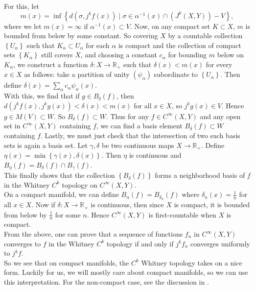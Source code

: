 \documentclass[reqno]{amsart}
\theoremstyle{definition}
\theoremstyle{remark}
\begin{document}
For this, let
\[
m(x) = \inf \left\{ d\left( \sigma, j^{k}f(x) \right) 
 \mid \sigma \in \alpha^{-1}(x) \cap
\left( J^{k}(X,Y) \right) -V \right\},
\] 
where we let
$m(x) = \infty$ if $\alpha^{-1}(x) \subset V$.
Now, on any compact set $K \subset X$, 
$m$ is bounded from below by some constant. So
covering $X$ by a countable collection 
$\left\{ U_{\alpha} \right\} $ such that
$K_{\alpha} \subset U_{\alpha}$ for each $\alpha$ is compact
and the collection of compact
sets $\left\{ K_{\alpha} \right\} $  still covers
$X$, and
choosing a constant
$c_{\alpha}$ for bounding $m$ below on $K_{\alpha}$, we
construct a function
$\delta \colon X \to \mathbb{R}_+$ such that
$\delta(x) < m(x)$ for every $x \in X$ as follows:
take a partition of unity $\left( \psi_{\alpha} \right) $
subordinate to
$\left\{ U_{\alpha} \right\} $. Then define
$\delta (x) = 
\sum_{\alpha} c_{\alpha} \psi_{\alpha}(x)$.\\
With this, we find that
if $g \in B_{\delta}(f)$, then
$d \left( j^{k}f(x), j^{k}g(x) \right) <
\delta(x) < m(x)$ for all
$x \in X$, so
$j^{k}g(x) \in V$. Hence
$g \in M(V) \subset W$.
So $B_{\delta}(f) \subset W$. 
Thus for any
$f \in C^{\infty}(X,Y)$ 
and any open set in $C^{\infty}(X,Y)$ containing $f$,
we can find a basis element
$B_{\delta}(f) \subset W$ containing $ f$.
Lastly, we must just check that
the intersection of two such basis sets is again a basis set.
Let
$\gamma, \delta$ be two continuous maps
$X \to \mathbb{R}_+$. Define
$\eta (x) = \min \left\{ \gamma(x), \delta(x) \right\} $.
Then $\eta$ is continuous and
$B_{\eta}(f) = 
B_{\delta}(f) \cap B_{\gamma}(f)$.\\
This finally shows that the collection
$\left\{ B_{\delta}(f) \right\} $ forms a neighborhood
basis of $f$ in the Whitney $C^{k}$ topology
on $C^{\infty}(X,Y)$.\\
\linebreak
On a compact manifold, we can define
$B_n(f) = B_{\delta_n}(f)$ where
$\delta_n (x) = \frac{1}{n}$ for all $x \in X$.
Now if $\delta \colon X \to \mathbb{R}_+$ is continuous, then
since $X$ is compact, it is bounded
from below by $\frac{1}{n}$ for some $n$. 
Hence $C^{\infty}(X,Y)$ is first-countable when
$X$ is compact. \\
From the above, one can prove that a
sequence of functions $f_n$ in $C^{\infty}(X,Y)$ converges to
$f$ in the Whitney $C^{k}$ topology if and only if
$j^{k}f_n$ converges uniformly to $j^{k}f$.\\
So we see that on compact manifolds, the $C^{k}$ Whitney
topology takes on a nice form. Luckily for us, we
will mostly care about compact manifolds, so 
we can use this interpretation. 
For the non-compact case, see the discussion in
\cite{GG}.
\end{document}
